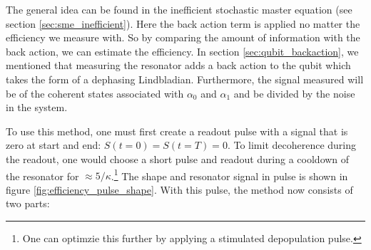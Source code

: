 The general idea can be found in the inefficient stochastic master equation (see section \ref{sec:sme_inefficient}). Here the back action term is applied no matter the efficiency we measure with. So by comparing the amount of information with the back action, we can estimate the efficiency. In section \ref{sec:qubit_backaction}, we mentioned that measuring the resonator adds a back action to the qubit which takes the form of a dephasing Lindbladian. Furthermore, the signal measured will be of the coherent states associated with $\alpha_0$ and $\alpha_1$ and be divided by the noise in the system.

To use this method, one must first create a readout pulse with a signal that is zero at start and end: $S(t = 0) = S(t = T) = 0$. To limit decoherence during the readout, one would choose a short pulse and readout during a cooldown of the resonator for $\approx 5 / \kappa$.\footnote{One can optimzie this further by applying a stimulated depopulation pulse.} The shape and resonator signal in pulse is shown in figure \ref{fig:efficiency_pulse_shape}. With this pulse, the method now consists of two parts:


